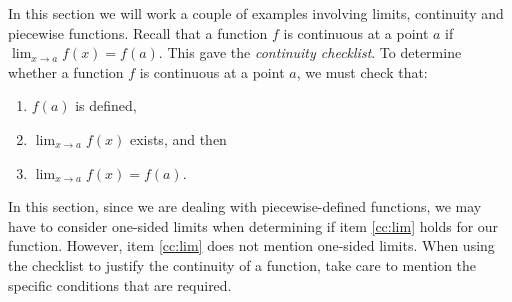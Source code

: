 \documentclass{ximera}
\begin{document}
In this section we will work a couple of examples involving limits, continuity and piecewise functions.
Recall that a function $f$ is continuous at a point $a$ if $\displaystyle \lim_{x\to a}f(x) = f(a)$.
This gave the \emph{continuity checklist}. To determine whether a function $f$ is continuous at a point $a$, we must check that:
\begin{enumerate}
	\item \label{cc:val} $f(a)$ is defined,
	\item \label{cc:lim} $\lim_{x\to a} f(x)$ exists, and then
	\item \label{cc:conc} $\lim_{x\to a} f(x) = f(a)$.
\end{enumerate}
In this section, since we are dealing with piecewise-defined functions, we may have to consider one-sided limits when determining if
item \ref{cc:lim} holds for our function. However, item \ref{cc:lim} does not mention one-sided limits. When using the checklist to
justify the continuity of a function, take care to mention the specific conditions that are required.
\end{document}
